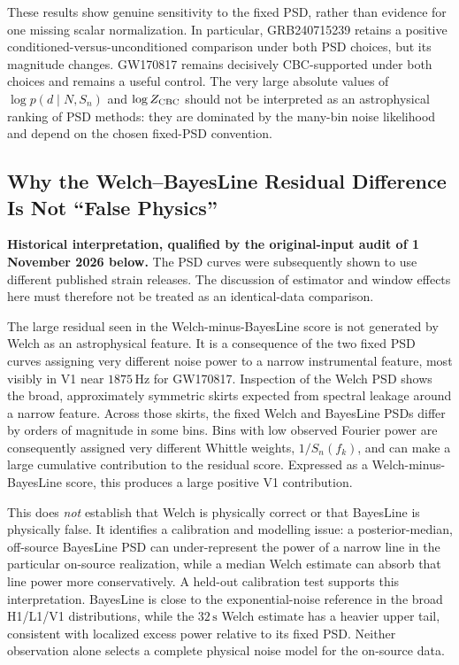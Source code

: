 These results show genuine sensitivity to the fixed PSD, rather than evidence
for one missing scalar normalization. In particular, GRB240715239 retains a
positive conditioned-versus-unconditioned comparison under both PSD choices,
but its magnitude changes. GW170817 remains decisively CBC-supported under
both choices and remains a useful control. The very large absolute values of
$\log p(d\mid N,S_n)$ and $\log Z_{\rm CBC}$ should not be interpreted as
an astrophysical ranking of PSD methods: they are dominated by the many-bin
noise likelihood and depend on the chosen fixed-PSD convention.

\subsection{Why the Welch--BayesLine Residual Difference Is Not ``False Physics''}

\textbf{Historical interpretation, qualified by the original-input audit
of 1 November 2026 below.} The PSD curves were subsequently shown to use
different published strain releases. The discussion of estimator and window
effects here must therefore not be treated as an identical-data comparison.

The large residual seen in the Welch-minus-BayesLine score is not generated by
Welch as an astrophysical feature. It is a consequence of the two fixed PSD
curves assigning very different noise power to a narrow instrumental feature,
most visibly in V1 near $1875\,\mathrm{Hz}$ for GW170817. Inspection of the
Welch PSD shows the broad, approximately symmetric skirts expected from
spectral leakage around a narrow feature. Across those skirts, the fixed Welch
and BayesLine PSDs differ by orders of magnitude in some bins. Bins with low
observed Fourier power are consequently assigned very different Whittle
weights, $1/S_n(f_k)$, and can make a large cumulative contribution to the
residual score. Expressed as a Welch-minus-BayesLine score, this produces a
large positive V1 contribution.

This does \emph{not} establish that Welch is physically correct or that
BayesLine is physically false. It identifies a calibration and modelling
issue: a posterior-median, off-source BayesLine PSD can under-represent the
power of a narrow line in the particular on-source realization, while a
median Welch estimate can absorb that line power more conservatively. A
held-out calibration test supports this interpretation. BayesLine is close to
the exponential-noise reference in the broad H1/L1/V1 distributions, while
the $32\,\mathrm{s}$ Welch estimate has a heavier upper tail, consistent with
localized excess power relative to its fixed PSD. Neither observation alone
selects a complete physical noise model for the on-source data.

